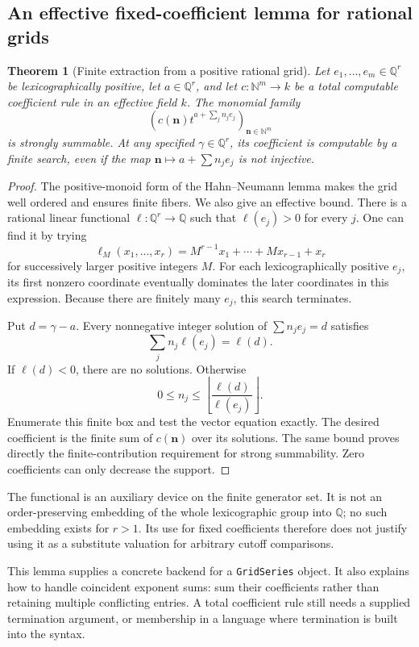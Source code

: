 \documentclass[11pt,letterpaper]{article}
\numberwithin{equation}{section}
\newtheorem{theorem}{Theorem}[section]
\theoremstyle{definition}
\theoremstyle{remark}\newtheorem{remark}[theorem]{Remark}
\newcommand{\Q}{\mathbb Q}
\newcommand{\N}{\mathbb N}
\begin{document}
\subsection{An effective fixed-coefficient lemma for rational grids}
\begin{theorem}[Finite extraction from a positive rational grid]
\label{thm:grid}
Let $e_1,\ldots,e_m\in\Q^r$ be lexicographically positive, let $a\in\Q^r$,
and let $c:\N^m\to k$ be a total computable coefficient rule in an effective
field $k$. The monomial family
\begin{equation}\label{eq:gridseries}
 \left(c(\boldsymbol n)t^{a+\sum_jn_je_j}\right)_{\boldsymbol n\in\N^m}
\end{equation}
is strongly summable. At any specified $\gamma\in\Q^r$, its coefficient is
computable by a finite search, even if the map
$\boldsymbol n\mapsto a+\sum n_je_j$ is not injective.
\end{theorem}
\begin{proof}
The positive-monoid form of the Hahn--Neumann lemma makes the grid well
ordered and ensures finite fibers. We also give an effective bound.
There is a rational linear functional $\ell:\Q^r\to\Q$ such that
$\ell(e_j)>0$ for every $j$. One can find it by trying
\[
 \ell_M(x_1,\ldots,x_r)=M^{r-1}x_1+\cdots+Mx_{r-1}+x_r
\]
for successively larger positive integers $M$. For each lexicographically
positive $e_j$, its first nonzero coordinate eventually dominates the later
coordinates in this expression. Because there are finitely many $e_j$,
this search terminates.

Put $d=\gamma-a$. Every nonnegative integer solution of
$\sum n_je_j=d$ satisfies
\[
 \sum_jn_j\ell(e_j)=\ell(d).
\]
If $\ell(d)<0$, there are no solutions. Otherwise
\[
 0\le n_j\le\left\lfloor\frac{\ell(d)}{\ell(e_j)}\right\rfloor.
\]
Enumerate this finite box and test the vector equation exactly. The desired
coefficient is the finite sum of $c(\boldsymbol n)$ over its solutions.
The same bound proves directly the finite-contribution requirement for
strong summability. Zero coefficients can only decrease the support.
\end{proof}
The functional is an auxiliary device on the finite generator set. It is
not an order-preserving embedding of the whole lexicographic group into
$\Q$; no such embedding exists for $r>1$. Its use for fixed coefficients
therefore does not justify using it as a substitute valuation for arbitrary
cutoff comparisons.

This lemma supplies a concrete backend for a \texttt{GridSeries} object.
It also explains how to handle coincident exponent sums: sum their
coefficients rather than retaining multiple conflicting entries. A total
coefficient rule still needs a supplied termination argument, or membership
in a language where termination is built into the syntax.
\end{document}
